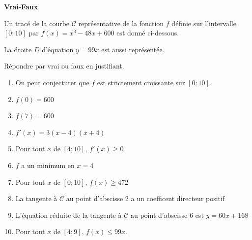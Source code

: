 \documentclass[10pt,a4paper,openany,twoside, eleve]{book}
\begin{document}
\begin{exon} \textbf{Vrai-Faux}

  Un tracé de la courbe $\mathcal{C}$ représentative de la fonction $f$
  définie sur l'intervalle $[0;10]$ par
  $f(x)=x^3-48x+600$ est donné ci-dessous.

  La droite $D$ d'équation $y=99x$ est aussi représentée.


  Répondre par vrai ou faux en justifiant.

  \begin{enumerate}
    \item On peut conjecturer que $f$ est strictement croissante sur $[0;10]$.
    \item $f(0)=600$
    \item $f(7)=600$
    \item $f'(x)=3(x-4)(x+4)$
    \item Pour tout $x$ de $[4;10]$, $f'(x)\geqslant0$
    \item $f$ a un minimum en $x=4$
    \item Pour tout $x$ de $[0;10]$, $f(x)\geqslant472$
    \item La tangente à $\mathcal{C}$ au point d'abscisse 2
          a un coefficent directeur positif
    \item L'équation réduite de la tangente à $\mathcal{C}$ au point
          d'abscisse 6 est $y=60x+168$
    \item Pour tout $x$ de $[4;9]$, $f(x)\leqslant 99x$.
  \end{enumerate}
\end{exon}
\end{document}

